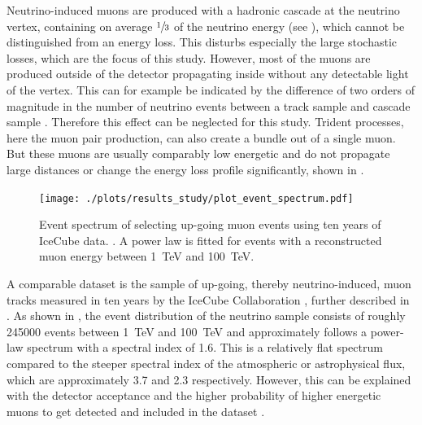 Neutrino-induced muons are produced with a hadronic cascade at the neutrino vertex, containing on average $\sfrac13$ of the neutrino energy (see ), which cannot be distinguished from an energy loss.
This disturbs especially the large stochastic losses, which are the focus of this study.
However, most of the muons are produced outside of the detector propagating inside without any detectable light of the vertex.
This can for example be indicated by the difference of two orders of magnitude in the number of neutrino events between a track sample \cite{IceCube2016Aachen} and cascade sample \cite{IceCube20Cascades}.
Therefore this effect can be neglected for this study.
Trident processes, here the muon pair production, can also create a bundle out of a single muon.
But these muons are usually comparably low energetic and do not propagate large distances or change the energy loss profile significantly, shown in .
\begin{figure}
    \centering
    \texttt{[image: ./plots/results\_study/plot\_event\_spectrum.pdf]}
    \caption{Event spectrum of selecting up-going muon events using ten years of IceCube data. \cite{Stettner19ICRC}. A power law is fitted for events with a reconstructed muon energy between \SI{1}{TeV} and \SI{100}{TeV}.}
    \label{fig:study_event_spectrum}
\end{figure}

A comparable dataset is the sample of up-going, thereby neutrino-induced, muon tracks measured in ten years by the IceCube Collaboration \cite{Stettner19ICRC}, further described in \cite{IceCube2016Aachen}.
As shown in , the event distribution of the neutrino sample consists of roughly \num{245000} events between \SI{1}{TeV} and \SI{100}{TeV} and approximately follows a power-law spectrum with a spectral index of \num{1.6}.
This is a relatively flat spectrum compared to the steeper spectral index of the atmospheric or astrophysical flux, which are approximately \num{3.7} and \num{2.3} respectively.
However, this can be explained with the detector acceptance and the higher probability of higher energetic muons to get detected and included in the dataset \cite{IceCube2016Aachen}.

